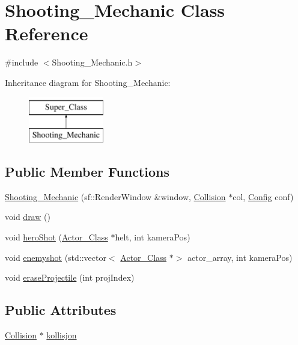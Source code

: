 \hypertarget{class_shooting___mechanic}{}\section{Shooting\+\_\+\+Mechanic Class Reference}
\label{class_shooting___mechanic}


{\ttfamily \#include $<$Shooting\+\_\+\+Mechanic.\+h$>$}

Inheritance diagram for Shooting\+\_\+\+Mechanic\+:\begin{figure}[H]
\begin{center}
\leavevmode
\includegraphics[height=2.000000cm]{class_shooting___mechanic}
\end{center}
\end{figure}
\subsection*{Public Member Functions}
\begin{DoxyCompactItemize}
\item 
\hyperlink{class_shooting___mechanic_a2c1defa547e5b53d057a5296d6776107}{Shooting\+\_\+\+Mechanic} (sf\+::\+Render\+Window \&window, \hyperlink{class_collision}{Collision} $\ast$col, \hyperlink{class_config}{Config} conf)
\item 
void \hyperlink{class_shooting___mechanic_a563bb47b2bb1c5f141cf47579d1402a6}{draw} ()
\item 
void \hyperlink{class_shooting___mechanic_a24b0992f715aa5e07a8d81c229401de0}{hero\+Shot} (\hyperlink{class_actor___class}{Actor\+\_\+\+Class} $\ast$helt, int kamera\+Pos)
\item 
void \hyperlink{class_shooting___mechanic_a2589f160241b7703aa04a3e2ffb11a9a}{enemyshot} (std\+::vector$<$ \hyperlink{class_actor___class}{Actor\+\_\+\+Class} $\ast$$>$ actor\+\_\+array, int kamera\+Pos)
\item 
void \hyperlink{class_shooting___mechanic_ae400341fd136cbd1ba39e5bcef2d6537}{erase\+Projectile} (int proj\+Index)
\end{DoxyCompactItemize}
\subsection*{Public Attributes}
\begin{DoxyCompactItemize}
\item 
\hyperlink{class_collision}{Collision} $\ast$ \hyperlink{class_shooting___mechanic_a73bdc235eb4ec579ba4d715cdb295e4e}{kollisjon}
\end{DoxyCompactItemize}
